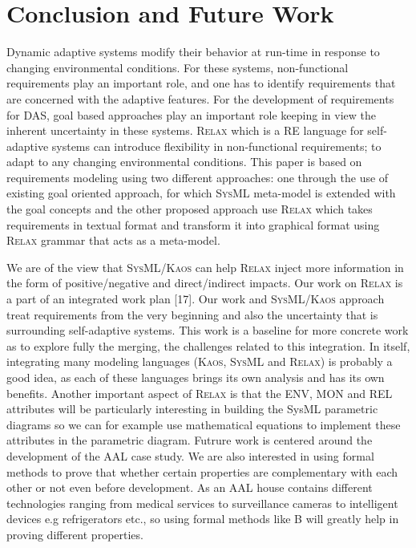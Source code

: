 \documentclass[10pt, conference, compsocconf]{IEEEtran}
\def\myrelax{\textsc{Relax}}                  %
\def\sysml{\textsc{SysML}}
\def\kaos{\textsc{Kaos}}
\begin{document}
\section{Conclusion and Future Work}\label{sec:Conclusion and Future Work}

Dynamic adaptive systems modify their behavior at run-time in response to changing environmental conditions. For these systems, non-functional requirements play an important role, and one has to identify requirements that are concerned with the adaptive features. For the development of requirements for DAS, goal based approaches play an important role keeping in view the inherent uncertainty in these systems. \myrelax{} which is a RE language for self-adaptive systems can introduce flexibility in non-functional requirements; to adapt to any changing environmental conditions. This paper is based on requirements modeling using two different approaches: one through the use of existing goal oriented approach, for which \sysml{} meta-model is extended with the goal concepts and the other proposed approach use \myrelax{} which takes requirements in textual format and transform it into graphical format using \myrelax{} grammar that acts as a meta-model. 

We are of the view that \sysml{}/\kaos{} can help \myrelax{} inject more information in the form of positive/negative and direct/indirect impacts. Our work on \myrelax{} is a part of an integrated work plan [17].  Our work and \sysml{}/\kaos{} approach treat requirements from the very beginning and also the uncertainty that is surrounding self-adaptive systems. This work is a baseline for more concrete work as to explore fully the merging, the challenges related to this integration. In itself, integrating many modeling languages (\kaos, \sysml{} and \myrelax{}) is probably a good idea, as each of these languages brings its own analysis and has its own benefits. Another important aspect of \myrelax{} is that the ENV, MON and REL attributes will be particularly interesting in building the SysML parametric diagrams so we can for example use mathematical equations to implement these attributes in the parametric diagram. Futrure work is centered around the development of the AAL case study. We are also interested in using formal methods to prove that whether certain properties are complementary with each other or not even before development. As an AAL house contains different technologies ranging from medical services to surveillance cameras to intelligent devices e.g refrigerators etc., so using formal methods like B will greatly help in proving different properties. 
\end{document}
